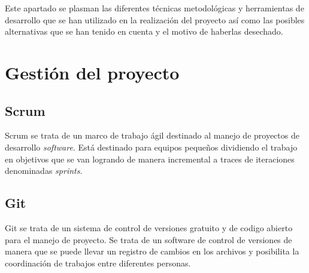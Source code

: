 

\begin{comment}
Esta parte de la memoria tiene como objetivo presentar las técnicas metodológicas y las herramientas de desarrollo que se han utilizado para llevar a cabo el proyecto. Si se han estudiado diferentes alternativas de metodologías, herramientas, bibliotecas se puede hacer un resumen de los aspectos más destacados de cada alternativa, incluyendo comparativas entre las distintas opciones y una justificación de las elecciones realizadas. 
No se pretende que este apartado se convierta en un capítulo de un libro dedicado a cada una de las alternativas, sino comentar los aspectos más destacados de cada opción, con un repaso somero a los fundamentos esenciales y referencias bibliográficas para que el lector pueda ampliar su conocimiento sobre el tema.
\end{comment}

\begin{comment}

IDE:vs code, pycharm, jupyter, editor latex

lenguaje python,librerias
\end{comment}

Este apartado se plasman las diferentes técnicas metodológicas y herramientas de desarrollo que se han utilizado en la realización del proyecto así como las posibles alternativas que se han tenido en cuenta y el motivo de haberlas desechado.

\section{Gestión del proyecto}\label{GesProyecto}
\subsection{Scrum}\label{Scrum}
Scrum se trata de un marco de trabajo ágil destinado al manejo de proyectos de desarrollo \emph{software}. Está destinado para equipos pequeños dividiendo el trabajo en objetivos que se van logrando de manera incremental a traces de iteraciones denominadas \emph{sprints}. \cite{wiki:scrm}

\subsection{Git}\label{Git}
Git se trata de un sistema de control de versiones gratuito y de codigo abierto para el manejo de proyecto. Se trata de un software de control de versiones de manera que se puede llevar un registro de cambios en los archivos y posibilita la coordinación de trabajos entre diferentes personas. \cite{}

